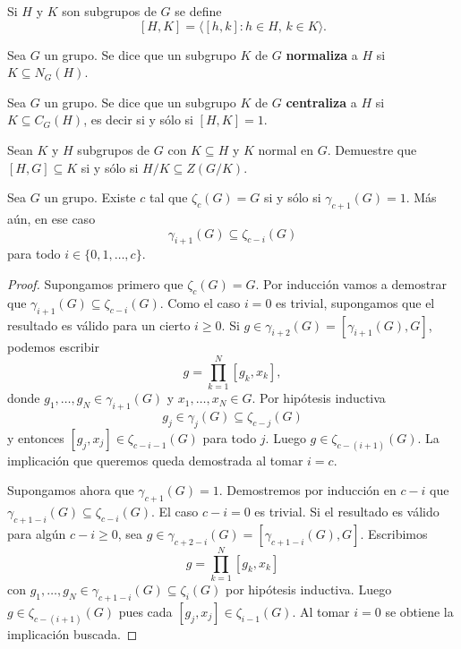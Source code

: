 Si $H$ y $K$ son subgrupos de $G$ se define
\[
	[H,K]=\langle [h,k]:h\in H,\,k\in K\rangle.
\]

\begin{definition}
	Sea $G$ un grupo. Se dice que un subgrupo $K$ de $G$ \textbf{normaliza} a
	$H$ si $K\subseteq N_G(H)$. 
\end{definition}

\begin{definition}
	Sea $G$ un grupo. Se dice que un subgrupo $K$ de $G$ \textbf{centraliza} a
	$H$ si $K\subseteq C_G(H)$, es decir si y sólo si $[H,K]=1$.
\end{definition}

\begin{exercise}
	Sean $K$ y $H$ subgrupos de $G$ con $K\subseteq H$ y $K$ normal en $G$.
	Demuestre que $[H,G]\subseteq K$ si y sólo si $H/K\subseteq Z(G/K)$. 
\end{exercise}
\begin{lemma}
	\label{lemma:gamma_zeta}
	Sea $G$ un grupo. Existe $c$ tal que $\zeta_c(G)=G$ si y sólo si 
	$\gamma_{c+1}(G)=1$. Más aún, en ese caso 
	\[
	\gamma_{i+1}(G)\subseteq\zeta_{c-i}(G)
	\]
	para todo $i\in\{0,1,\dots,c\}$. 
\end{lemma}

\begin{proof}
	Supongamos primero que $\zeta_c(G)=G$. Por inducción vamos a demostrar
	que $\gamma_{i+1}(G)\subseteq\zeta_{c-i}(G)$.  Como el caso $i=0$ es
	trivial, supongamos que el resultado es válido para un cierto $i\geq0$. Si
	$g\in\gamma_{i+2}(G)=[\gamma_{i+1}(G),G]$, podemos escribir 
	\[
	g=\prod_{k=1}^N [g_k,x_k],
	\]
	donde $g_1,\dots,g_N\in\gamma_{i+1}(G)$ y $x_1,\dots,x_N\in G$. Por
	hipótesis inductiva 
	\[
	g_j\in\gamma_j(G)\subseteq\zeta_{c-j}(G)
	\]
	y entonces $[g_j,x_j]\in\zeta_{c-i-1}(G)$ para todo $j$. Luego
	$g\in\zeta_{c-(i+1)}(G)$. La implicación que queremos queda demostrada
	al tomar $i=c$. 

	Supongamos ahora que $\gamma_{c+1}(G)=1$. Demostremos por inducción en $c-i$ que
	$\gamma_{c+1-i}(G)\subseteq\zeta_{c-i}(G)$. El caso $c-i=0$ es trivial. Si el
	resultado es válido para algún $c-i\geq0$, sea
	$g\in\gamma_{c+2-i}(G)=[\gamma_{c+1-i}(G),G]$. Escribimos
	\[
		g=\prod_{k=1}^N[g_k,x_k]
	\]
	con $g_1,\dots,g_N\in\gamma_{c+1-i}(G)\subseteq\zeta_{i}(G)$ por
	hipótesis inductiva. Luego $g\in \zeta_{c-(i+1)}(G)$ pues cada
	$[g_j,x_j]\in\zeta_{i-1}(G)$. Al tomar $i=0$ se obtiene la implicación
	buscada.
\end{proof}

